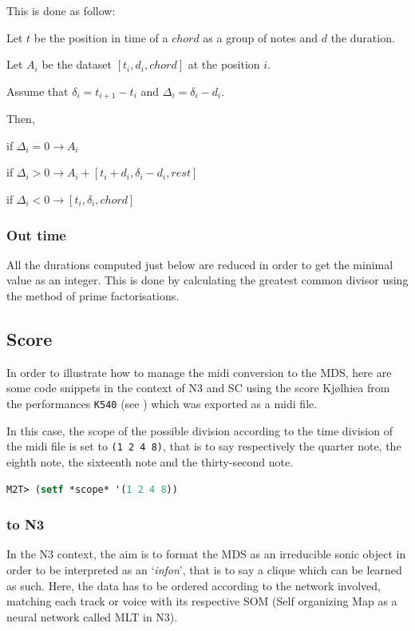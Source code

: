 This is done as follow:

\noindent Let $t$ be the position in time of a $chord$ as a group of notes and $d$ the duration.

\noindent Let $A_i$ be the dataset $[ t_i, d_i, chord ]$ at the position $i$.

\noindent Assume that $\delta_i = t_{i+1} - t_i$ and $\Delta_i = \delta_i - d_i$.

\noindent Then,

if $\Delta_i = 0 \rightarrow A_i$

if $\Delta_i > 0 \rightarrow A_i + [ t_i + d_i, \delta_i - d_i, rest ]$

if $\Delta_i < 0 \rightarrow [ t_i, \delta_i, chord ]$

\subsubsection{Out time}

All the durations computed just below are reduced in order to get the minimal value as an integer. This is done by calculating the greatest common divisor using the method of prime factorisations.

\subsection{Score}
\label{score}

In order to illustrate how to manage the midi conversion to the MDS, here are some code snippets in the context of N3 and SC using the score Kj{\o}lhiea from the performances \texttt{K540} (see ) which was exported as a midi file.

\smallskip

In this case, the scope of the possible division according to the time division of the midi file is set to \texttt{(1 2 4 8)}, that is to say respectively the quarter note, the eighth note, the sixteenth note and the thirty-second note.

\begin{lstlisting}[language=Lisp]
M2T> (setf *scope* '(1 2 4 8))
\end{lstlisting}

\subsubsection{to N3}

In the N3 context, the aim is to format the MDS as an irreducible sonic object in order to be interpreted as an `\textit{infon}', that is to say a clique which can be learned as such. Here, the data has to be ordered according to the network involved, matching each track or voice with its respective SOM (Self organizing Map as a neural network called MLT in N3). 

